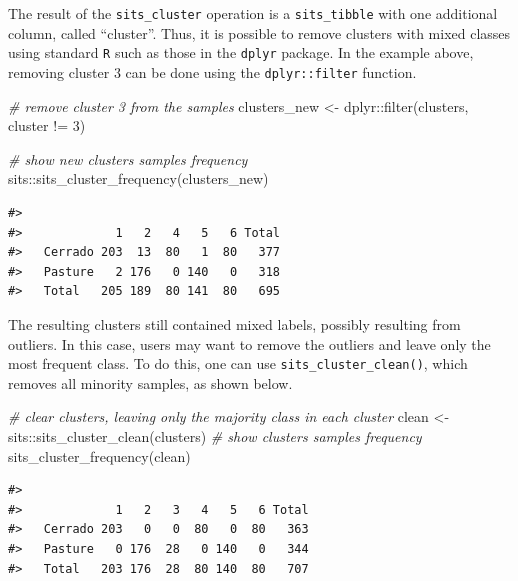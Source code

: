 \documentclass[a4paper,]{tufte-book}
\newenvironment{Shaded}{}{}
\newcommand{\CommentTok}[1]{\textcolor[rgb]{0.38,0.63,0.69}{\textit{#1}}}
\newcommand{\DecValTok}[1]{\textcolor[rgb]{0.25,0.63,0.44}{#1}}
\newcommand{\FunctionTok}[1]{\textcolor[rgb]{0.02,0.16,0.49}{#1}}
\newcommand{\NormalTok}[1]{#1}
\newcommand{\OtherTok}[1]{\textcolor[rgb]{0.00,0.44,0.13}{#1}}
\newcommand{\SpecialCharTok}[1]{\textcolor[rgb]{0.25,0.44,0.63}{#1}}
\begin{document}
The result of the \texttt{sits\_cluster} operation is a \texttt{sits\_tibble} with one additional column, called ``cluster''. Thus, it is possible to remove clusters with mixed classes using standard \texttt{R} such as those in the \texttt{dplyr} package. In the example above, removing cluster \(3\) can be done using the \texttt{dplyr::filter} function.

\begin{Shaded}
\begin{Highlighting}[]
\CommentTok{\# remove cluster 3 from the samples}
\NormalTok{clusters\_new }\OtherTok{\textless{}{-}}\NormalTok{ dplyr}\SpecialCharTok{::}\FunctionTok{filter}\NormalTok{(clusters, cluster }\SpecialCharTok{!=} \DecValTok{3}\NormalTok{)}

\CommentTok{\# show new clusters samples frequency}
\NormalTok{sits}\SpecialCharTok{::}\FunctionTok{sits\_cluster\_frequency}\NormalTok{(clusters\_new)}
\end{Highlighting}
\end{Shaded}

\begin{verbatim}
#>          
#>             1   2   4   5   6 Total
#>   Cerrado 203  13  80   1  80   377
#>   Pasture   2 176   0 140   0   318
#>   Total   205 189  80 141  80   695
\end{verbatim}

The resulting clusters still contained mixed labels, possibly resulting from outliers. In this case, users may want to remove the outliers and leave only the most frequent class. To do this, one can use \texttt{sits\_cluster\_clean()}, which removes all minority samples, as shown below.

\begin{Shaded}
\begin{Highlighting}[]
\CommentTok{\# clear clusters, leaving only the majority class in each cluster}
\NormalTok{clean }\OtherTok{\textless{}{-}}\NormalTok{ sits}\SpecialCharTok{::}\FunctionTok{sits\_cluster\_clean}\NormalTok{(clusters)}
\CommentTok{\# show clusters samples frequency}
\FunctionTok{sits\_cluster\_frequency}\NormalTok{(clean)}
\end{Highlighting}
\end{Shaded}

\begin{verbatim}
#>          
#>             1   2   3   4   5   6 Total
#>   Cerrado 203   0   0  80   0  80   363
#>   Pasture   0 176  28   0 140   0   344
#>   Total   203 176  28  80 140  80   707
\end{verbatim}
\end{document}
